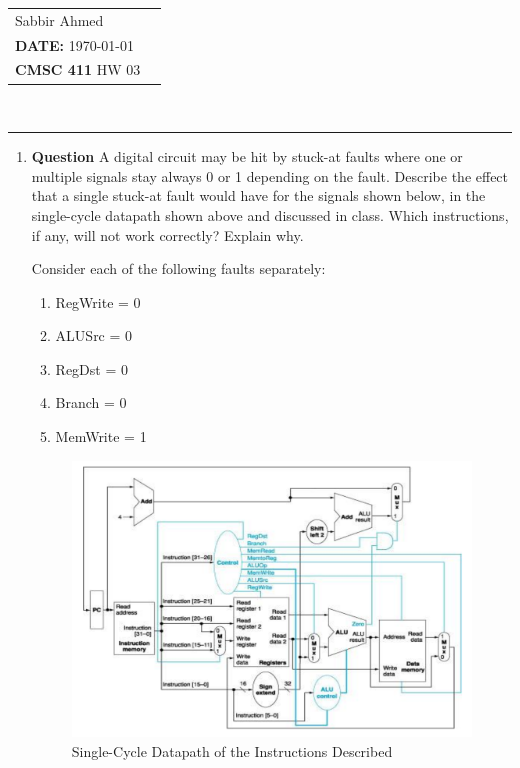 \documentclass[paper=usletter, fontsize=12pt]{article}
\newcommand{\documentinfo}[5]{
    \begin{centering}
        \parbox{2in}{
        \begin{spacing}{1}
            \begin{flushleft}
                \begin{tabular}{l l}
                    #1 \\
                    #2 \\
                    #3 \\
                \end{tabular}\\
                \rule{\textwidth}{1pt}
            \end{flushleft}
        \end{spacing}
        }
    \end{centering}
}
\begin{document}
    \documentinfo{Sabbir Ahmed}{\textbf{DATE:} \today}{\textbf{CMSC 411} HW 03}
    \vspace{-0.3in}

    \begin{enumerate}

        \item \textbf{Question}
        A digital circuit may be hit by stuck-at faults where one or multiple signals stay always 0 or 1 depending on the fault. Describe the effect that a single stuck-at fault would have for the signals shown below, in the single-cycle datapath shown above and discussed in class. Which instructions, if any, will not work correctly? Explain why.

        Consider each of the following faults separately:

        \begin{enumerate}

            \item RegWrite = 0
            \item ALUSrc = 0
            \item RegDst = 0
            \item Branch = 0
            \item MemWrite = 1

        \end{enumerate}

        \begin{figure}[ht]
            \begin{center}
                \includegraphics[width=1\textwidth]{circuit.png}
                \caption{Single-Cycle Datapath of the Instructions Described} \label{fig:circuit}
            \end{center}
        \end{figure}


\end{enumerate}
\end{document}
